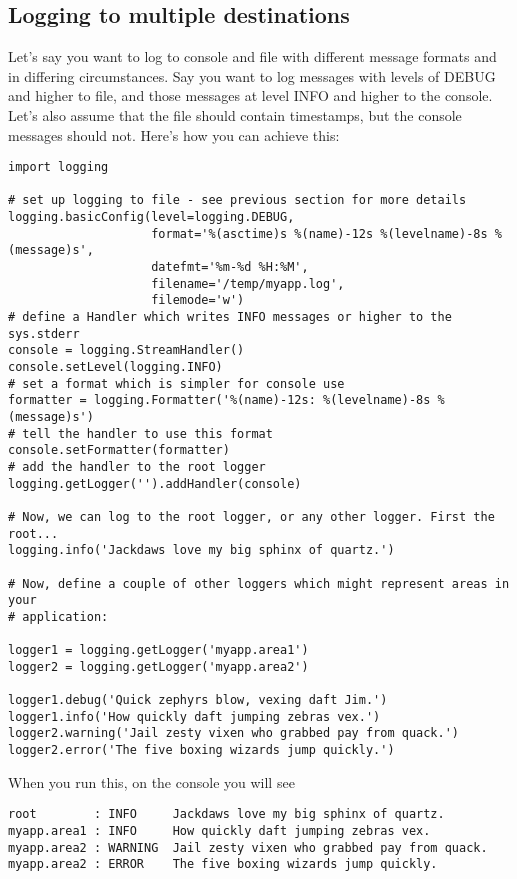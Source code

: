 \subsection{Logging to multiple destinations \label{multiple-destinations}}

Let's say you want to log to console and file with different message formats
and in differing circumstances. Say you want to log messages with levels
of DEBUG and higher to file, and those messages at level INFO and higher to
the console. Let's also assume that the file should contain timestamps, but
the console messages should not. Here's how you can achieve this:

\begin{verbatim}
import logging

# set up logging to file - see previous section for more details
logging.basicConfig(level=logging.DEBUG,
                    format='%(asctime)s %(name)-12s %(levelname)-8s %(message)s',
                    datefmt='%m-%d %H:%M',
                    filename='/temp/myapp.log',
                    filemode='w')
# define a Handler which writes INFO messages or higher to the sys.stderr
console = logging.StreamHandler()
console.setLevel(logging.INFO)
# set a format which is simpler for console use
formatter = logging.Formatter('%(name)-12s: %(levelname)-8s %(message)s')
# tell the handler to use this format
console.setFormatter(formatter)
# add the handler to the root logger
logging.getLogger('').addHandler(console)

# Now, we can log to the root logger, or any other logger. First the root...
logging.info('Jackdaws love my big sphinx of quartz.')

# Now, define a couple of other loggers which might represent areas in your
# application:

logger1 = logging.getLogger('myapp.area1')
logger2 = logging.getLogger('myapp.area2')

logger1.debug('Quick zephyrs blow, vexing daft Jim.')
logger1.info('How quickly daft jumping zebras vex.')
logger2.warning('Jail zesty vixen who grabbed pay from quack.')
logger2.error('The five boxing wizards jump quickly.')
\end{verbatim}

When you run this, on the console you will see

\begin{verbatim}
root        : INFO     Jackdaws love my big sphinx of quartz.
myapp.area1 : INFO     How quickly daft jumping zebras vex.
myapp.area2 : WARNING  Jail zesty vixen who grabbed pay from quack.
myapp.area2 : ERROR    The five boxing wizards jump quickly.
\end{verbatim}

